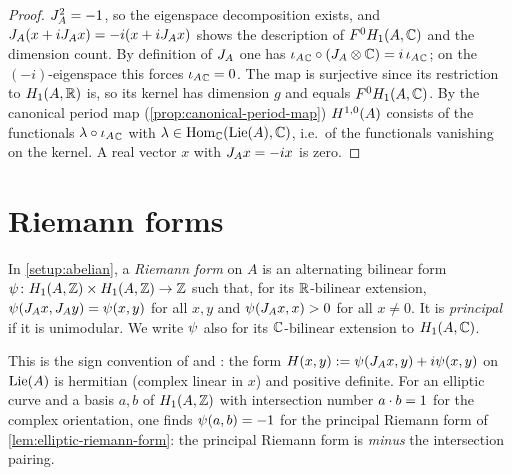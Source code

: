 \begin{proof}
$J_{A}^{2} = -1$, so the eigenspace decomposition exists,
and $J_{A}(x + iJ_{A}x) =
-i(x + iJ_{A}x)$ shows the description of
$F^{0}H_{1}(A,\mathbb{C})$ and the dimension count. By definition of
$J_{A}$ one has ${\iota_{A}}_{\mathbb{C}}\circ
(J_{A}\otimes\mathbb{C}) = i\,{\iota_{A}}_{\mathbb{C}}$;
on the $(-i)$-eigenspace this forces
${\iota_{A}}_{\mathbb{C}} = 0$. The map is surjective since
its restriction to $H_{1}(A,\mathbb{R})$ is, so its kernel has dimension $g$
and equals $F^{0}H_{1}(A,\mathbb{C})$. By the canonical period map
(\cref{prop:canonical-period-map}) $H^{1,0}(A)$ consists of the
functionals $\lambda\circ{\iota_{A}}_{\mathbb{C}}$ with
$\lambda \in \operatorname{Hom}_{\mathbb{C}}(\mathrm{Lie}(A), \mathbb{C})$, i.e.\ of the functionals
vanishing on the kernel. A real vector $x$ with
$J_{A}x = -ix$ is zero.
\end{proof}

\begin{remark}
\end{remark}

\section{Riemann forms}

\begin{definition}\label{def:riemann-form}
In \cref{setup:abelian}, a \emph{Riemann form} on $A$ is an alternating
bilinear form
$\psi_{} \colon H_{1}(A,\mathbb{Z})\times H_{1}(A,\mathbb{Z}) \to \mathbb{Z}$ such
that, for its $\mathbb{R}$-bilinear extension,
$\psi_{}(J_{A}x, J_{A}y) =
\psi_{}(x,y)$ for all $x, y$ and
$\psi_{}(J_{A}x, x) > 0$ for all $x \neq 0$. It is
\emph{principal} if it is unimodular. We write $\psi_{}$ also for
its $\mathbb{C}$-bilinear extension to $H_{1}(A,\mathbb{C})$.
\end{definition}

\begin{remark}\label{rem:riemann-sign}
This is the sign convention of \cite[\S 2]{Mumford1974} and
\cite[\S 2.1]{BirkenhakeLange2004}: the form
$H(x,y) := \psi_{}(J_{A}x, y) + i\psi_{}(x,y)$
on $\mathrm{Lie}(A)$ is hermitian (complex linear in $x$) and positive definite.
For an elliptic curve and a basis $a, b$ of $H_{1}(A,\mathbb{Z})$ with
intersection number $a\cdot b = 1$ for the complex
orientation, one finds $\psi_{}(a,b) = -1$ for the principal Riemann
form of \cref{lem:elliptic-riemann-form}: the principal Riemann form is
\emph{minus} the intersection pairing.
\end{remark}

